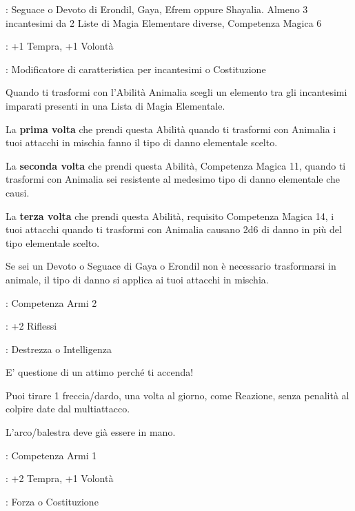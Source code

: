 \begin{multicols}{2}
\begin{description}[noitemsep, topsep=0pt, parsep=0pt, partopsep=0pt, leftmargin=0cm, labelwidth=2.5cm]
    \item[\textbf{Requisito}]: Seguace o Devoto di Erondil, Gaya, Efrem oppure Shayalia. Almeno 3 incantesimi da 2 Liste di Magia Elementare diverse, Competenza Magica 6
    \item[\textbf{Tiri Salvezza}]: +1 Tempra, +1 Volontà
    \item[\textbf{Caratteristica}]: Modificatore di caratteristica per incantesimi o Costituzione
\end{description}

Quando ti trasformi con l'Abilità Animalia scegli un elemento tra gli incantesimi imparati presenti in una Lista di Magia Elementale.

La \textbf{prima volta} che prendi questa Abilità quando ti trasformi con Animalia i tuoi attacchi in mischia fanno il tipo di danno elementale scelto.

La \textbf{seconda volta} che prendi questa Abilità, Competenza Magica 11, quando ti trasformi con Animalia sei resistente al medesimo tipo di danno elementale che causi.

La \textbf{terza volta} che prendi questa Abilità, requisito Competenza Magica 14, i tuoi attacchi quando ti trasformi con Animalia causano 2d6 di danno in più del tipo elementale scelto.

Se sei un Devoto o Seguace di Gaya o Erondil non è necessario trasformarsi in animale, il tipo di danno si applica ai tuoi attacchi in mischia.

\begin{description}[noitemsep, topsep=0pt, parsep=0pt, partopsep=0pt, leftmargin=0cm, labelwidth=2.5cm]
    \item[\textbf{Requisito}]: Competenza Armi 2
    \item[\textbf{Tiri Salvezza}]: +2 Riflessi
    \item[\textbf{Caratteristica}]: Destrezza o Intelligenza
\end{description}

E' questione di un attimo perché ti accenda!

Puoi tirare 1 freccia/dardo, una volta al giorno, come Reazione, senza penalità al colpire date dal multiattacco.

L'arco/balestra deve già essere in mano.

\begin{description}[noitemsep, topsep=0pt, parsep=0pt, partopsep=0pt, leftmargin=0cm, labelwidth=2.5cm]
    \item[\textbf{Requisito}]: Competenza Armi 1
    \item[\textbf{Tiri Salvezza}]: +2 Tempra, +1 Volontà
    \item[\textbf{Caratteristica}]: Forza o Costituzione
\end{description}


\end{multicols}
